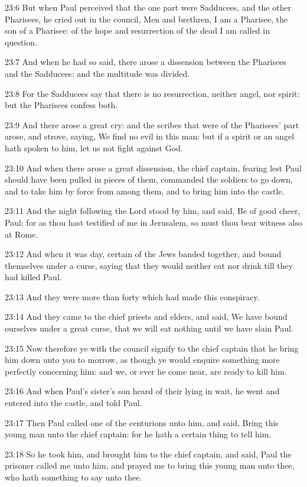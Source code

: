23:6 But when Paul perceived that the one part were Sadducees, and the other Pharisees, he cried out in the council, Men and brethren, I am a Pharisee, the son of a Pharisee: of the hope and resurrection of the dead I am called in question.

23:7 And when he had so said, there arose a dissension between the Pharisees and the Sadducees: and the multitude was divided.

23:8 For the Sadducees say that there is no resurrection, neither angel, nor spirit: but the Pharisees confess both.

23:9 And there arose a great cry: and the scribes that were of the Pharisees' part arose, and strove, saying, We find no evil in this man: but if a spirit or an angel hath spoken to him, let us not fight against God.

23:10 And when there arose a great dissension, the chief captain, fearing lest Paul should have been pulled in pieces of them, commanded the soldiers to go down, and to take him by force from among them, and to bring him into the castle.

23:11 And the night following the Lord stood by him, and said, Be of good cheer, Paul: for as thou hast testified of me in Jerusalem, so must thou bear witness also at Rome.

23:12 And when it was day, certain of the Jews banded together, and bound themselves under a curse, saying that they would neither eat nor drink till they had killed Paul.

23:13 And they were more than forty which had made this conspiracy.

23:14 And they came to the chief priests and elders, and said, We have bound ourselves under a great curse, that we will eat nothing until we have slain Paul.

23:15 Now therefore ye with the council signify to the chief captain that he bring him down unto you to morrow, as though ye would enquire something more perfectly concerning him: and we, or ever he come near, are ready to kill him.

23:16 And when Paul's sister's son heard of their lying in wait, he went and entered into the castle, and told Paul.

23:17 Then Paul called one of the centurions unto him, and said, Bring this young man unto the chief captain: for he hath a certain thing to tell him.

23:18 So he took him, and brought him to the chief captain, and said, Paul the prisoner called me unto him, and prayed me to bring this young man unto thee, who hath something to say unto thee.

